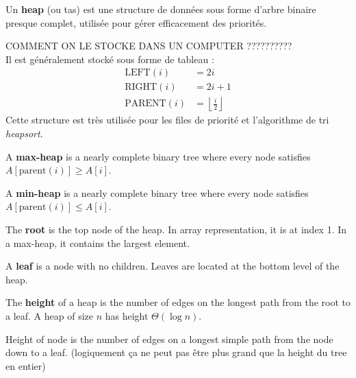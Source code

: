 \documentclass[11pt,a4paper,openany]{book}
\begin{document}
\begin{defnbox}[title=Heap]

Un \textbf{heap} (ou tas) est une structure de données sous forme d’arbre binaire presque complet, utilisée pour gérer efficacement des priorités.

COMMENT ON LE STOCKE DANS UN COMPUTER ?????????? \\
Il est généralement stocké sous forme de tableau :
\[
\begin{aligned}
\text{LEFT}(i) &= 2i \\
\text{RIGHT}(i) &= 2i + 1 \\
\text{PARENT}(i) &= \left\lfloor \frac{i}{2} \right\rfloor
\end{aligned}
\]
Cette structure est très utilisée pour les files de priorité et l’algorithme de tri \textit{heapsort}.
\end{defnbox}


\begin{defnbox}[title=Max-heap property]
A \textbf{max-heap} is a nearly complete binary tree where every node satisfies
$A[\text{parent}(i)] \geq A[i]$.
\end{defnbox}

\begin{defnbox}[title=Min-heap property]
A \textbf{min-heap} is a nearly complete binary tree where every node satisfies
$A[\text{parent}(i)] \leq A[i]$.
\end{defnbox}







\begin{defnbox}[title=Root]
The \textbf{root} is the top node of the heap. In array representation, it is at index 1.  
In a max-heap, it contains the largest element.
\end{defnbox}

\begin{defnbox}[title=Leaf]
A \textbf{leaf} is a node with no children.  
Leaves are located at the bottom level of the heap.
\end{defnbox}

\begin{defnbox}[title=Height]
The \textbf{height} of a heap is the number of edges on the longest path from the root to a leaf.  
A heap of size $n$ has height $\Theta(\log n)$.
\end{defnbox}

\begin{defnbox}[title=Height of a node]
Height of node is the number of edges on a longest simple path from the node
down to a leaf. (logiquement ça ne peut pas être plus grand que la height du tree en entier)
\end{defnbox}
\end{document}
